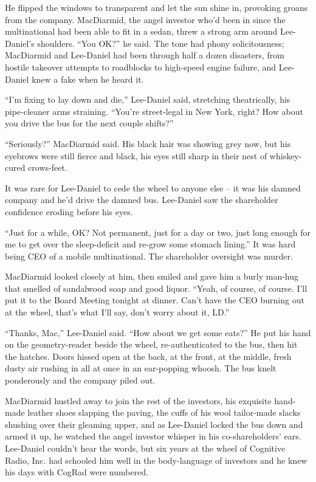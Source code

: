 He flipped the windows to transparent and let the sun shine in, 
provoking groans from the company. MacDiarmid, the angel investor who'd 
been in since the multinational had been able to fit in a sedan, threw 
a strong arm around Lee-Daniel's shoulders. “You OK?” he said. The 
tone had phony solicitousness; MacDiarmid and Lee-Daniel had been 
through half a dozen disasters, from hostile takeover attempts to 
roadblocks to high-speed engine failure, and Lee-Daniel knew a fake 
when he heard it.

“I'm fixing to lay down and die,” Lee-Daniel said, stretching 
theatrically, his pipe-cleaner arms straining. “You're street-legal 
in New York, right? How about you drive the bus for the next couple 
shifts?”

“Seriously?” MacDiarmid said. His black hair was showing grey now, 
but his eyebrows were still fierce and black, his eyes still sharp in 
their nest of whiskey-cured crows-feet.

It was rare for Lee-Daniel to cede the wheel to anyone else -- it was 
his damned company and he'd drive the damned bus. Lee-Daniel saw the 
shareholder confidence eroding before his eyes.

“Just for a while, OK? Not permanent, just for a day or two, just 
long enough for me to get over the sleep-deficit and re-grow some 
stomach lining.” It was hard being CEO of a mobile multinational. The 
shareholder oversight was murder.

MacDiarmid looked closely at him, then smiled and gave him a burly 
man-hug that smelled of sandalwood soap and good liquor. “Yeah, of 
course, of course. I'll put it to the Board Meeting tonight at dinner. 
Can't have the CEO burning out at the wheel, that's what I'll say, 
don't worry about it, LD.”

“Thanks, Mac,” Lee-Daniel said. “How about we get some eats?” 
He put his hand on the geometry-reader beside the wheel, 
re-authenticated to the bus, then hit the hatches. Doors hissed open at 
the back, at the front, at the middle, fresh dusty air rushing in all 
at once in an ear-popping whoosh. The bus knelt ponderously and the 
company piled out.

MacDiarmid hustled away to join the rest of the investors, his 
exquisite hand-made leather shoes slapping the paving, the cuffs of his 
wool tailor-made slacks shushing over their gleaming upper, and as 
Lee-Daniel locked the bus down and armed it up, he watched the angel 
investor whisper in his co-shareholders' ears. Lee-Daniel couldn't hear 
the words, but six years at the wheel of Cognitive Radio, Inc. had 
schooled him well in the body-language of investors and he knew his 
days with CogRad were numbered.

